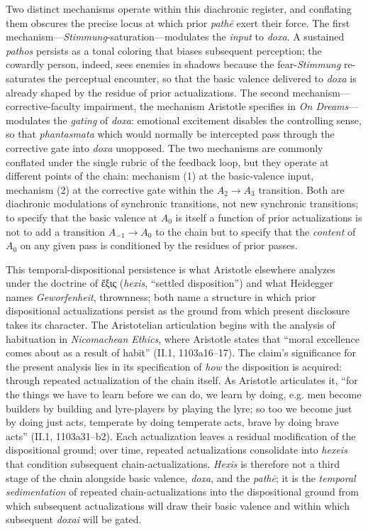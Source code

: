 \documentclass{article}
\begin{document}
Two distinct mechanisms operate within this diachronic register, and conflating them obscures the precise locus at which prior \textit{path\=e} exert their force. The first mechanism---\textit{Stimmung}-saturation---modulates the \textit{input} to \textit{doxa}. A sustained \textit{pathos} persists as a tonal coloring that biases subsequent perception; the cowardly person, indeed, sees enemies in shadows because the fear-\textit{Stimmung} re-saturates the perceptual encounter, so that the basic valence delivered to \textit{doxa} is already shaped by the residue of prior actualizations. The second mechanism---corrective-faculty impairment, the mechanism Aristotle specifies in \textit{On Dreams}---modulates the \textit{gating} of \textit{doxa}: emotional excitement disables the controlling sense, so that \textit{phantasmata} which would normally be intercepted pass through the corrective gate into \textit{doxa} unopposed. The two mechanisms are commonly conflated under the single rubric of the feedback loop, but they operate at different points of the chain: mechanism (1) at the basic-valence input, mechanism (2) at the corrective gate within the $A_2 \rightarrow A_3$ transition. Both are diachronic modulations of synchronic transitions, not new synchronic transitions; to specify that the basic valence at $A_0$ is itself a function of prior actualizations is not to add a transition $A_{-1} \rightarrow A_0$ to the chain but to specify that the \textit{content} of $A_0$ on any given pass is conditioned by the residues of prior passes.

This temporal-dispositional persistence is what Aristotle elsewhere analyzes under the doctrine of ἕξις (\textit{hexis}, ``settled disposition'') and what Heidegger names \textit{Geworfenheit}, thrownness; both name a structure in which prior dispositional actualizations persist as the ground from which present disclosure takes its character. The Aristotelian articulation begins with the analysis of habituation in \textit{Nicomachean Ethics}, where Aristotle states that ``moral excellence comes about as a result of habit'' (II.1, 1103a16--17). The claim's significance for the present analysis lies in its specification of \textit{how} the disposition is acquired: through repeated actualization of the chain itself. As Aristotle articulates it, ``for the things we have to learn before we can do, we learn by doing, e.g. men become builders by building and lyre-players by playing the lyre; so too we become just by doing just acts, temperate by doing temperate acts, brave by doing brave acts'' (II.1, 1103a31--b2). Each actualization leaves a residual modification of the dispositional ground; over time, repeated actualizations consolidate into \textit{hexeis} that condition subsequent chain-actualizations. \textit{Hexis} is therefore not a third stage of the chain alongside basic valence, \textit{doxa}, and the \textit{path\=e}; it is the \textit{temporal sedimentation} of repeated chain-actualizations into the dispositional ground from which subsequent actualizations will draw their basic valence and within which subsequent \textit{doxai} will be gated.
\end{document}
